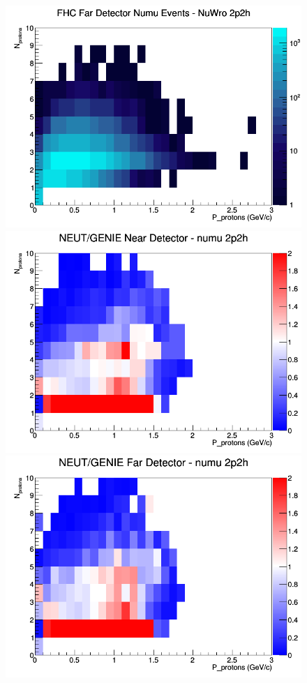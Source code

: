 \begin{figure}[h]
\endminipage
{}
\includegraphics[width=\linewidth]{N_P/nominal/protons/2p2h_FHC_FD_numu_N_P_NuWro.png}
\endminipage
\newline
{}
\includegraphics[width=\linewidth]{N_P/nominal/protons/ratios/2p2h_NEUT_GENIE_numu_near_N_P.png}
\endminipage
{}
\includegraphics[width=\linewidth]{N_P/nominal/protons/ratios/2p2h_NEUT_GENIE_numu_far_N_P.png}

\end{figure}
